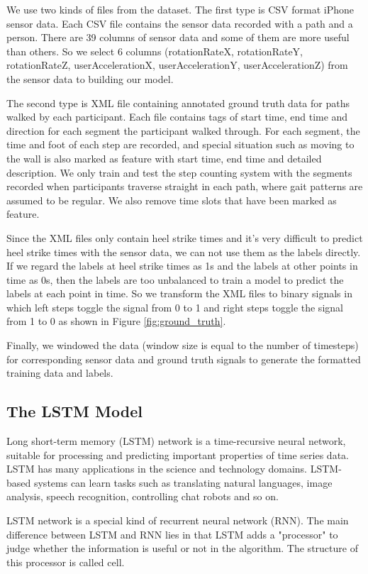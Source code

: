 \documentclass[11pt]{article}
\begin{document}
We use two kinds of files from the dataset. The first type is CSV format iPhone sensor data.  Each CSV file contains the sensor data recorded with a path and a person. There are 39 columns of sensor data and some of them are more useful than others. So we select 6 columns (rotationRateX, rotationRateY, rotationRateZ,  userAccelerationX, userAccelerationY, userAccelerationZ) from the sensor data to building our model. 

The second type is XML file containing annotated ground truth data for paths walked by each participant. Each file contains tags of start time, end time and direction for each segment the participant walked through. For each segment, the time and foot of each step are recorded, and special situation such as moving to the wall is also marked as feature with start time, end time and detailed description. We only train and test the step counting system with the segments recorded when participants traverse straight in each path, where gait patterns are assumed to be regular. We also remove time slots that have been marked as feature. 

Since the XML files only contain heel strike times and it's very difficult to predict heel strike times with the sensor data, we can not use them as the labels directly. If we regard the labels at heel strike times as 1s and the labels at other points in time as 0s, then the labels are too unbalanced to train a model to predict the labels at each point in time. So we transform the XML files to binary signals in which left steps toggle the signal from 0 to 1 and right steps toggle the signal from 1 to 0 as shown in Figure \ref{fig:ground_truth}.

Finally, we windowed the data (window size is equal to the number of timesteps) for corresponding sensor data and ground truth signals to generate the formatted training data and labels.


\subsection{The LSTM Model}
Long short-term memory (LSTM) network is a time-recursive neural network, suitable for processing and predicting important properties of time series data. LSTM has many applications in the science and technology domains. LSTM-based systems can learn tasks such as translating natural languages, image analysis, speech recognition, controlling chat robots and so on.

LSTM network is a special kind of recurrent neural network (RNN). The main difference between LSTM and RNN lies in that LSTM adds a "processor" to judge whether the information is useful or not in the algorithm. The structure of this processor is called cell.
\end{document}
